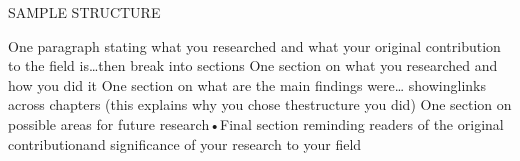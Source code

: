 SAMPLE STRUCTURE

One paragraph stating what you researched and what your original contribution to the field is…then break into sections
One section on what you researched and how you did it
One section on what are the main findings were… showinglinks across chapters (this explains why you chose thestructure you did)
One section on possible areas for future research•Final section reminding readers of the original contributionand significance of your research to your field